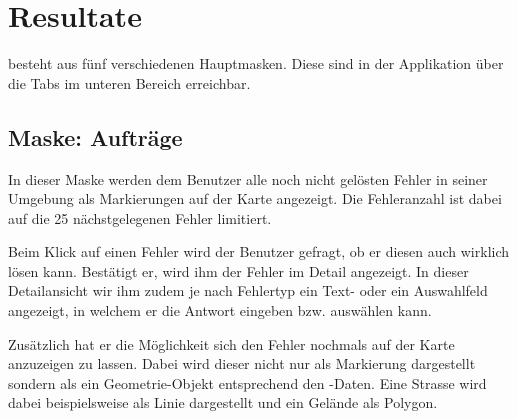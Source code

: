 \section{Resultate}

\kort{} besteht aus fünf verschiedenen Hauptmasken.
Diese sind in der Applikation über die Tabs im unteren Bereich erreichbar.

\subsection{Maske: Aufträge}
In dieser Maske werden dem Benutzer alle noch nicht gelösten Fehler in seiner Umgebung als Markierungen auf der Karte angezeigt.
Die Fehleranzahl ist dabei auf die 25 nächstgelegenen Fehler limitiert.

Beim Klick auf einen Fehler wird der Benutzer gefragt, ob er diesen auch wirklich lösen kann.
Bestätigt er, wird ihm der Fehler im Detail angezeigt.
In dieser Detailansicht wir ihm zudem je nach Fehlertyp ein Text- oder ein Auswahlfeld angezeigt, in welchem er die Antwort eingeben bzw. auswählen kann. 

Zusätzlich hat er die Möglichkeit sich den Fehler nochmals auf der Karte anzuzeigen zu lassen.
Dabei wird dieser nicht nur als Markierung dargestellt sondern als ein Geometrie-Objekt entsprechend den -Daten.
Eine Strasse wird dabei beispielsweise als Linie dargestellt und ein Gelände als Polygon.

